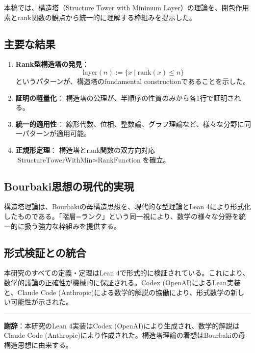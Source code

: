 \documentclass[a4paper,12pt]{ltjsarticle}
\theoremstyle{definition}
\begin{document}
本稿では、構造塔（Structure Tower with Minimum Layer）の理論を、閉包作用素とrank関数の観点から統一的に理解する枠組みを提示した。

\subsection{主要な結果}

\begin{enumerate}
\item \textbf{Rank型構造塔の発見}：
$$\text{layer}(n) := \{x \mid \text{rank}(x) \leq n\}$$
というパターンが、構造塔のfundamental constructionであることを示した。

\item \textbf{証明の軽量化}：
構造塔の公理が、半順序の性質のみから各1行で証明される。

\item \textbf{統一的適用性}：
線形代数、位相、整数論、グラフ理論など、様々な分野に同一パターンが適用可能。

\item \textbf{正規形定理}：
構造塔とrank関数の双方向対応$\text{StructureTowerWithMin} \simeq \text{RankFunction}$を確立。
\end{enumerate}

\subsection{Bourbaki思想の現代的実現}

構造塔理論は、Bourbakiの母構造思想を、現代的な型理論とLean 4により形式化したものである。「階層=ランク」という同一視により、数学の様々な分野を統一的に扱う強力な枠組みを提供する。

\subsection{形式検証との統合}

本研究のすべての定義・定理はLean 4で形式的に検証されている。これにより、数学的議論の正確性が機械的に保証される。Codex (OpenAI)によるLean実装と、Claude Code (Anthropic)による数学的解説の協働により、形式数学の新しい可能性が示された。

\begin{center}
\rule{0.5\textwidth}{0.4pt}
\end{center}

\noindent
\textbf{謝辞}：本研究のLean 4実装はCodex (OpenAI)により生成され、数学的解説はClaude Code (Anthropic)により作成された。構造塔理論の着想はBourbakiの母構造思想に由来する。
\end{document}
